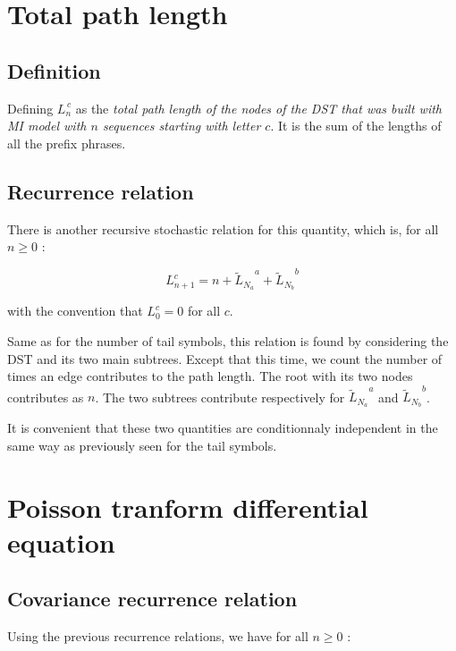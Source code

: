 \section{ Total path length }

\subsection{ Definition }

Defining $L_n^{\,c}$ as the \emph{total 
path length of the nodes of the DST that was built with
MI model with $n$ sequences starting with letter $c$}.
It is the sum of the lengths of all the prefix phrases.

\subsection{ Recurrence relation }

There is another recursive stochastic relation for 
this quantity, which is, for all $n\geq 0$ :

\[
  \boxed{ 
    L_{n+1}^c = n + 
                        {{\tilde L}_{N_a}}^a + 
                        {{\tilde L}_{N_b}}^b
  }
  \]

with the convention that $L_0^c = 0$ for all $c$.

Same as for the number of tail symbols, this relation 
is found by considering the DST and its two main
subtrees. Except that this time, we count the number 
of times an edge contributes to the path length.
The root with its two nodes contributes as $n$.
The two subtrees contribute respectively for 
${{\tilde L}_{N_a}}^a$ and ${{\tilde L}_{N_b}}^b$.

It is convenient that these two quantities are conditionnaly
independent in the same way as previously seen for the tail symbols.


\section{ Poisson tranform differential equation }

\subsection{ Covariance recurrence relation }

Using the previous recurrence relations, we have for all $n\geq 0$ :


